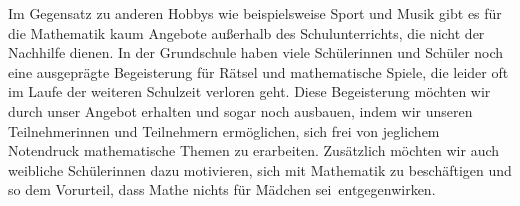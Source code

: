 \documentclass[12pt]{zettel}
\newcommand{\twopics}[2]{%
  \begin{figure}[b]%
    \vspace*{0.5cm}%
    \makebox[\textwidth][c]{%
      \texttt{[image: impressionen/\#1]}%
      \hspace*{1cm}%
      \texttt{[image: impressionen/\#2]}%
    }%
    \vspace*{-1cm}%
  \end{figure}
}
\begin{document}
Im Gegensatz zu anderen Hobbys wie beispielsweise Sport und Musik gibt es für die Mathematik kaum Angebote außerhalb des Schulunterrichts, die nicht der Nachhilfe dienen. In der Grundschule haben viele Schülerinnen und Schüler noch eine ausgeprägte Begeisterung für Rätsel und mathematische Spiele, die leider oft im Laufe der weiteren Schulzeit verloren geht. Diese Begeisterung möchten wir durch unser Angebot erhalten und sogar noch ausbauen, indem wir unseren Teilnehmerinnen und Teilnehmern ermöglichen, sich frei von jeglichem Notendruck mathematische Themen zu erarbeiten. Zusätzlich möchten wir auch weibliche Schülerinnen dazu motivieren, sich mit Mathematik zu beschäftigen und so dem Vorurteil, dass \glqq Mathe nichts für Mädchen sei\grqq\ entgegenwirken.
% 
% 
% 
% 
% 
% 
\end{document}
